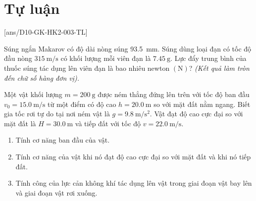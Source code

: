 \section{Tự luận} 
\setcounter{ex}{0}
[ans/D10-GK-HK2-003-TL]
\begin{ex}
	Súng ngắn Makarov có độ dài nòng súng \SI{93.5}{\milli\meter}. Súng dùng loại đạn có tốc độ đầu nòng $\SI{315}{\meter / \second}$ có khối lượng mỗi viên đạn là $\SI{7.45}{\gram}$. Lực đẩy trung bình của thuốc súng tác dụng lên viên đạn là bao nhiêu newton $\left(\si{\newton}\right)$? \textit{(Kết quả làm tròn đến chữ số hàng đơn vị).}
\end{ex}
\begin{ex}
	Một vật khối lượng $m=\SI{200}{\gram}$ được ném thẳng đứng lên trên với tốc độ ban đầu $v_0=\SI{15.0}{\meter/\second}$ từ một điểm có độ cao $h=\SI{20.0}{\meter}$ so với mặt đất nằm ngang. Biết gia tốc rơi tự do tại nơi ném vật là $g=\SI{9.8}{\meter/\second^2}$. Vật đạt độ cao cực đại so với mặt đất là $H=\SI{30.0}{\meter}$ và tiếp đất với tốc độ $v=\SI{22.0}{\meter/\second}$.
	\begin{enumerate}[label=\alph*)]
		\item Tính cơ năng ban đầu của vật.
		\item Tính cơ năng của vật khi nó đạt độ cao cực đại so với mặt đất và khi nó tiếp đất.
		\item Tính công của lực cản không khí tác dụng lên vật trong giai đoạn vật bay lên và giai đoạn vật rơi xuống.
	\end{enumerate}
\end{ex}
